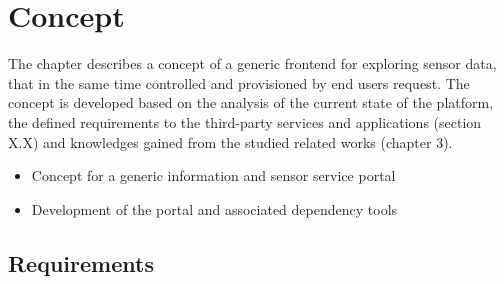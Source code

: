 \chapter{Concept}
     The chapter describes a concept of a generic frontend for exploring sensor data, 
     that in the same time controlled and provisioned by end users request. 
     The concept is developed based on the analysis of the current
     state of the platform, the defined requirements to the third-party services and applications
     (section X.X) and knowledges gained from the studied related works (chapter 3).

\begin{itemize}
     \item  Concept for a generic information and sensor service portal
     \item Development of the portal and associated dependency tools
\end{itemize}

\section{Requirements}
